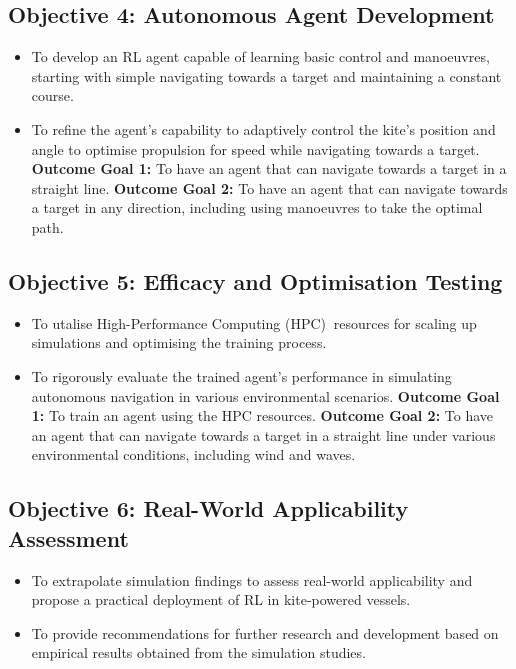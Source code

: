 \subsection*{Objective 4: Autonomous Agent Development}
\begin{itemize}
    \item To develop an RL agent capable of learning basic control and manoeuvres, starting with simple navigating towards a target and maintaining a constant course.
    \item To refine the agent's capability to adaptively control the kite's position and angle to optimise propulsion for speed while navigating towards a target.
    \newline\textbf{Outcome Goal 1:} To have an agent that can navigate towards a target in a straight line.
    \newline\textbf{Outcome Goal 2:} To have an agent that can navigate towards a target in any direction, including using manoeuvres to take the optimal path.
\end{itemize}

\subsection*{Objective 5: Efficacy and Optimisation Testing}
\begin{itemize}
    \item To utalise High-Performance Computing (HPC)$~$\cite{HPC} resources for scaling up simulations and optimising the training process.
    \item To rigorously evaluate the trained agent’s performance in simulating autonomous navigation in various environmental scenarios.
    \newline\textbf{Outcome Goal 1:} To train an agent using the HPC resources.
    \newline\textbf{Outcome Goal 2:} To have an agent that can navigate towards a target in a straight line under various environmental conditions, including wind and waves.
\end{itemize}

\subsection*{Objective 6: Real-World Applicability Assessment}
\begin{itemize}
    \item To extrapolate simulation findings to assess real-world applicability and propose a  practical deployment of RL in kite-powered vessels.
    \item To provide recommendations for further research and development based on empirical results obtained from the simulation studies.
\end{itemize}

